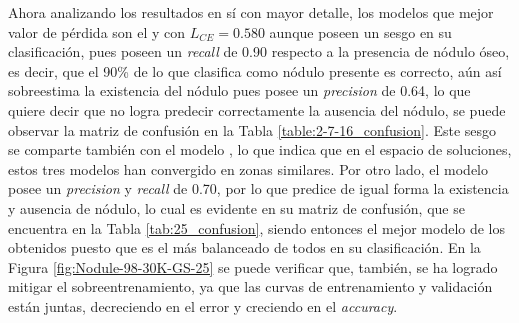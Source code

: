 Ahora analizando los resultados en sí con mayor detalle, los modelos que mejor valor de pérdida son el  y  con $L_{CE}=0.580$ aunque poseen un sesgo en su clasificación, pues poseen un \textit{recall} de 0.90 respecto a la presencia de nódulo óseo, es decir, que el 90\% de lo que clasifica como nódulo presente es correcto, aún así sobreestima la existencia del nódulo pues posee un \textit{precision} de 0.64, lo que quiere decir que no logra predecir correctamente la ausencia del nódulo, se puede observar la matriz de confusión en la Tabla \ref{table:2-7-16_confusion}. Este sesgo se comparte también con el modelo , lo que indica que en el espacio de soluciones, estos tres modelos han convergido en zonas similares. Por otro lado, el modelo  posee un \textit{precision} y \textit{recall} de 0.70, por lo que predice de igual forma la existencia y ausencia de nódulo, lo cual es evidente en su matriz de confusión, que se encuentra en la Tabla \ref{tab:25_confusion}, siendo entonces el mejor modelo de los obtenidos puesto que es el más balanceado de todos en su clasificación. En la Figura \ref{fig:Nodule-98-30K-GS-25} se puede verificar que, también, se ha logrado mitigar el sobreentrenamiento, ya que las curvas de entrenamiento y validación están juntas, decreciendo en el error y creciendo en el \textit{accuracy}.

